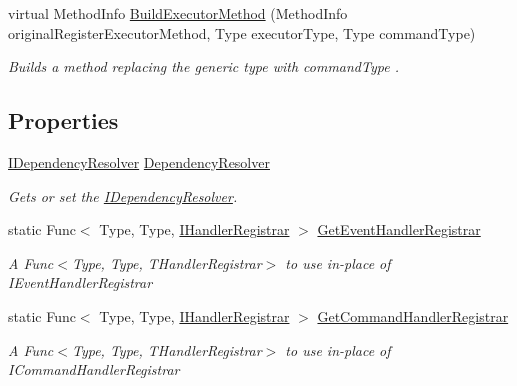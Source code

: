 \begin{DoxyCompactItemize}
virtual Method\+Info \hyperlink{classCqrs_1_1Configuration_1_1BusRegistrar_a03ecf12389b8f55b75c887e113520ac7_a03ecf12389b8f55b75c887e113520ac7}{Build\+Executor\+Method} (Method\+Info original\+Register\+Executor\+Method, Type executor\+Type, Type command\+Type)
\begin{DoxyCompactList}\small\item\em Builds a method replacing the generic type with {\itshape command\+Type} . \end{DoxyCompactList}\end{DoxyCompactItemize}
\subsection*{Properties}
\begin{DoxyCompactItemize}
\item 
\hyperlink{interfaceCqrs_1_1Configuration_1_1IDependencyResolver}{I\+Dependency\+Resolver} \hyperlink{classCqrs_1_1Configuration_1_1BusRegistrar_aafccd565c2d9a748ff0f850a94100399_aafccd565c2d9a748ff0f850a94100399}{Dependency\+Resolver}
\begin{DoxyCompactList}\small\item\em Gets or set the \hyperlink{interfaceCqrs_1_1Configuration_1_1IDependencyResolver}{I\+Dependency\+Resolver}. \end{DoxyCompactList}\item 
static Func$<$ Type, Type, \hyperlink{interfaceCqrs_1_1Bus_1_1IHandlerRegistrar}{I\+Handler\+Registrar} $>$ \hyperlink{classCqrs_1_1Configuration_1_1BusRegistrar_adaab0236b3ce39214ce60b2272e5ab19_adaab0236b3ce39214ce60b2272e5ab19}{Get\+Event\+Handler\+Registrar}
\begin{DoxyCompactList}\small\item\em A Func$<$\+Type, Type, T\+Handler\+Registrar$>$ to use in-\/place of I\+Event\+Handler\+Registrar \end{DoxyCompactList}\item 
static Func$<$ Type, Type, \hyperlink{interfaceCqrs_1_1Bus_1_1IHandlerRegistrar}{I\+Handler\+Registrar} $>$ \hyperlink{classCqrs_1_1Configuration_1_1BusRegistrar_a5ac56d73af9d550c70ee722daed7dce8_a5ac56d73af9d550c70ee722daed7dce8}{Get\+Command\+Handler\+Registrar}
\begin{DoxyCompactList}\small\item\em A Func$<$\+Type, Type, T\+Handler\+Registrar$>$ to use in-\/place of I\+Command\+Handler\+Registrar \end{DoxyCompactList}\end{DoxyCompactItemize}


